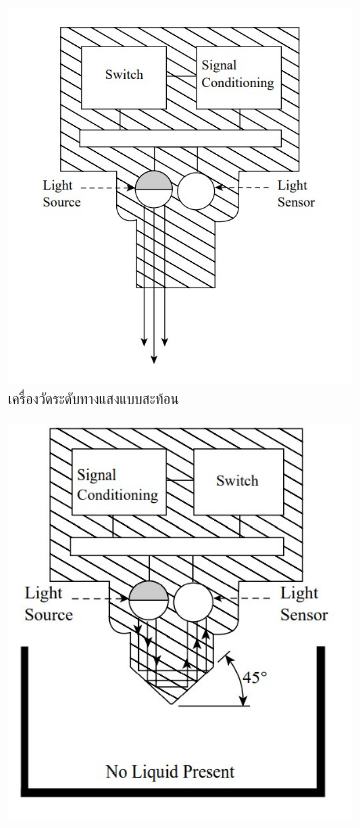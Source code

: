 \documentclass[final,11pt,a4paper]{article}
\begin{document}
\begin{figure}
    \begin{subfigure}[b]{0.4\textwidth}
        \centering
        \includegraphics[width=\textwidth]{images/Screenshot_23.jpg}
        \caption{เครื่องวัดระดับทางแสงแบบสะท้อน}
        \label{fig:ols1}
    \end{subfigure}
    \hfill
    \begin{subfigure}[b]{0.35\textwidth}
        \centering
        \includegraphics[width=\textwidth]{images/Screenshot_7.jpg}

\end{subfigure}
\end{figure}
\end{document}
